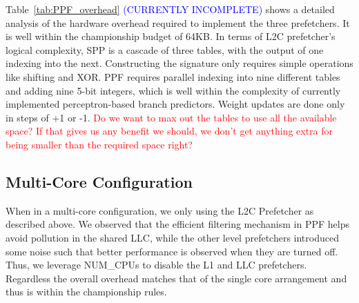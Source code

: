 Table~\ref{tab:PPF_overhead} \textcolor{blue}{(CURRENTLY INCOMPLETE)}
shows a detailed analysis of the hardware overhead required to
implement the three prefetchers. It is well within the championship
budget of 64KB. In terms of L2C prefetcher's logical complexity, SPP
is a cascade of three tables, with the output of one indexing into the
next. Constructing the signature only requires simple operations like
shifting and XOR. PPF requires parallel indexing into nine different
tables and adding nine 5-bit integers, which is well within the
complexity of currently implemented perceptron-based branch
predictors.  Weight updates are done only in steps of +1 or -1.
\textcolor{red}{Do we want to max out the tables to use all the
  available space?  If that gives us any benefit we should, we don't
  get anything extra for being smaller than the required space right?}


\subsection{Multi-Core Configuration}
\label{Config-Multi}

When in a multi-core configuration, we only using the L2C Prefetcher
as described above. We observed that the efficient filtering mechanism
in PPF helps avoid pollution in the shared LLC, while the other level
prefetchers introduced some noise such that better performance is
observed when they are turned off.  Thus, we leverage NUM_CPUs to
disable the L1 and LLC prefetchers.  Regardless the overall overhead
matches that of the single core arrangement and thus is within the
championship rules.
